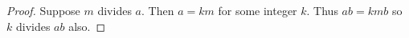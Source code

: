 \begin{proof}
    Suppose $m$ divides $a.$ Then $a=km$ for some integer $k.$ Thus $ab=kmb$ so $k$ divides $ab$ also.
\end{proof}